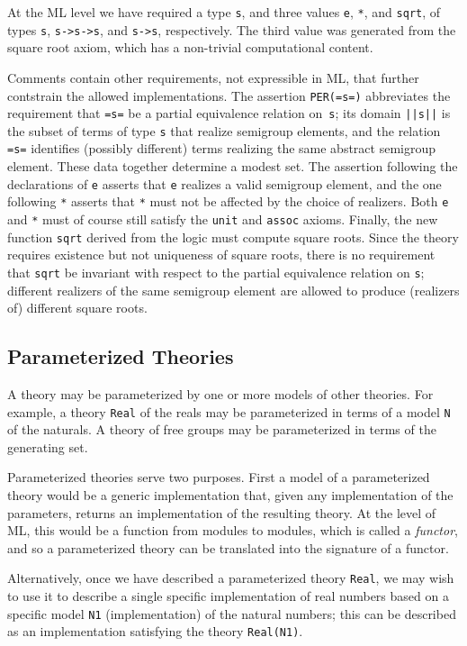 At the ML level we have required a type \Verb|s|, and three values
\Verb|e|, \Verb|*|, and \Verb|sqrt|, of types \Verb|s|,
\Verb|s->s->s|, and \Verb|s->s|, respectively. The third value was
generated from the square root axiom, which has a non-trivial
computational content.

Comments contain other requirements, not expressible in ML, that
further contstrain the allowed implementations. The assertion
\Verb|PER(=s=)| abbreviates the requirement that \Verb|=s=| be a
partial equivalence relation on~\Verb|s|; its domain \Verb+||s||+ is
the subset of terms of type \Verb|s| that realize semigroup
elements, and the relation \Verb|=s=| identifies (possibly different)
terms realizing the same abstract semigroup element. These data
together determine a modest set. The assertion following the
declarations of \Verb|e| asserts that \Verb|e| realizes a valid
semigroup element, and the one following \Verb|*| asserts that
\Verb|*| must not be affected by the choice of realizers. Both
\Verb|e| and \Verb|*| must of course still satisfy the \Verb|unit| and
\Verb|assoc| axioms. Finally, the new function \Verb|sqrt| derived
from the logic must compute square roots. Since the theory requires
existence but not uniqueness of square roots, there is no requirement
that \Verb|sqrt| be invariant with respect to the partial equivalence
relation on \Verb|s|; different realizers of the same semigroup
element are allowed to produce (realizers of) different square roots.


\subsection{Parameterized Theories}
\label{sec:param-theor-funct}

A theory may be parameterized by one or more models of other theories.
For example, a theory \Verb|Real| of the reals may be parameterized in
terms of a model \Verb|N| of the naturals.  A theory of free groups may be
parameterized in terms of the generating set.

Parameterized theories serve two purposes.  First a model of a
parameterized theory would be a generic implementation that, given any
implementation of the parameters, returns an implementation of the
resulting theory.  At the level of ML, this would be a function from
modules to modules, which is called a \emph{functor}, and so a
parameterized theory can be translated into the signature of a
functor.

Alternatively, once we have described a parameterized theory
\Verb|Real|, we may wish to use it to describe a single specific
implementation of real numbers based on a specific model \Verb|N1|
(implementation) of the natural numbers; this can be described as
an implementation satisfying the theory \Verb|Real(N1)|.

